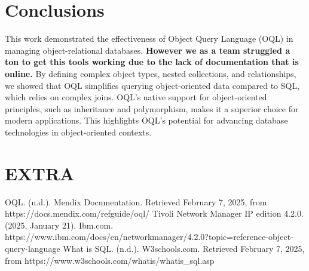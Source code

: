 \documentclass{article}
\begin{document}
\section{Conclusions}
This work demonstrated the effectiveness of Object Query Language (OQL) in managing object-relational databases. \textbf{However we as a team struggled a ton to get this tools working due to the lack of documentation that is online.} By defining complex object types, nested collections, and relationships, we showed that OQL simplifies querying object-oriented data compared to SQL, which relies on complex joins. OQL's native support for object-oriented principles, such as inheritance and polymorphism, makes it a superior choice for modern applications. This highlights OQL's potential for advancing database technologies in object-oriented contexts.
\section{EXTRA}
\begin{thebibliography}{9}
	OQL. (n.d.). Mendix Documentation. Retrieved February 7, 2025, from https://docs.mendix.com/refguide/oql/
	Tivoli Network Manager IP edition 4.2.0. (2025, January 21). Ibm.com. https://www.ibm.com/docs/en/networkmanager/4.2.0?topic=reference-object-query-language
	What is SQL. (n.d.). W3schools.com. Retrieved February 7, 2025, from https://www.w3schools.com/whatis/whatis\_sql.asp
\end{thebibliography}
\end{document}
